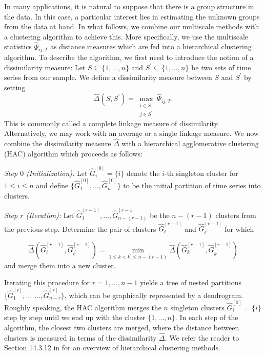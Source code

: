 In many applications, it is natural to suppose that there is a group structure in the data. In this case, a particular interest lies in estimating the unknown groups from the data at hand. In what follows, we combine our multiscale methods with a clustering algorithm to achieve this. More specifically, we use the multiscale statistics $\widehat{\Psi}_{ij,T}$ as distance measures which are fed into a hierarchical clustering algorithm. To describe the algorithm, we first need to introduce the notion of a dissimilarity measure: Let $S \subseteq \{1,\ldots,n\}$ and $S^\prime \subseteq \{1,\ldots,n\}$ be two sets of time series from our sample. We define a dissimilarity measure between $S$ and $S^\prime$ by setting 
\begin{equation}\label{dissimilarity}
\widehat{\Delta}(S,S^\prime) = \max_{\substack{i \in S, \\ j \in S^\prime}} \widehat{\Psi}_{ij,T}. 
\end{equation}
This is commonly called a complete linkage measure of dissimilarity. Alternatively, we may work with an average or a single linkage measure. We now combine the dissimilarity measure $\widehat{\Delta}$ with a hierarchical agglomerative clustering (HAC) algorithm which proceeds as follows: 
\vspace{10pt}

\noindent \textit{Step $0$ (Initialization):} Let $\widehat{G}_i^{[0]} = \{ i \}$ denote the $i$-th singleton cluster for $1 \le i \le n$ and define $\{\widehat{G}_1^{[0]},\ldots,\widehat{G}_n^{[0]} \}$ to be the initial partition of time series into clusters. 
\vspace{5pt}

\noindent \textit{Step $r$ (Iteration):} Let $\widehat{G}_1^{[r-1]},\ldots,\widehat{G}_{n-(r-1)}^{[r-1]}$ be the $n-(r-1)$ clusters from the previous step. Determine the pair of clusters $\widehat{G}_{\ell}^{[r-1]}$ and $\widehat{G}_{{\ell}^\prime}^{[r-1]}$ for which 

\[ \widehat{\Delta}(\widehat{G}_{\ell}^{[r-1]},\widehat{G}_{{\ell}^\prime}^{[r-1]}) = \min_{1 \le k < k^\prime \le n-(r-1)} \widehat{\Delta}(\widehat{G}_{k}^{[r-1]},\widehat{G}_{k^\prime}^{[r-1]}) \]  
and merge them into a new cluster. 
\vspace{10pt}

\noindent Iterating this procedure for $r = 1,\ldots,n-1$ yields a tree of nested partitions $\{\widehat{G}_1^{[r]},\ldots$ $\ldots,\widehat{G}_{n-r}^{[r]}\}$, which can be graphically represented by a dendrogram. Roughly speaking, the HAC algorithm merges the $n$ singleton clusters $\widehat{G}_i^{[0]} = \{ i \}$ step by step until we end up with the cluster $\{1,\ldots,n\}$. In each step of the algorithm, the closest two clusters are merged, where the distance between clusters is measured in terms of the dissimilarity $\widehat{\Delta}$. We refer the reader to Section 14.3.12 in \cite{HastieTibshiraniFriedman2009} for an overview of hierarchical clustering methods. 


